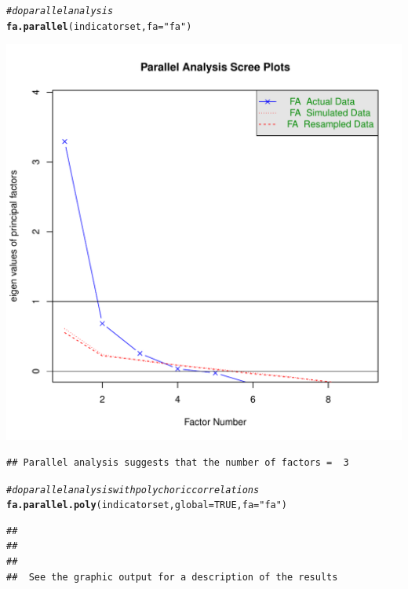 \documentclass{article}\usepackage[]{graphicx}\usepackage[]{color}
\makeatletter
\def\maxwidth{ %
  \ifdim\Gin@nat@width>\linewidth
    \linewidth
  \else
    \Gin@nat@width
  \fi
}
\newcommand{\hlnum}[1]{\textcolor[rgb]{0.686,0.059,0.569}{#1}}%
\newcommand{\hlstr}[1]{\textcolor[rgb]{0.192,0.494,0.8}{#1}}%
\newcommand{\hlcom}[1]{\textcolor[rgb]{0.678,0.584,0.686}{\textit{#1}}}%
\newcommand{\hlstd}[1]{\textcolor[rgb]{0.345,0.345,0.345}{#1}}%
\newcommand{\hlkwc}[1]{\textcolor[rgb]{0.333,0.667,0.333}{#1}}%
\newcommand{\hlkwd}[1]{\textcolor[rgb]{0.737,0.353,0.396}{\textbf{#1}}}%
\newenvironment{kframe}{%
 \def\at@end@of@kframe{}%
 \ifinner\ifhmode%
  \def\at@end@of@kframe{\end{minipage}}%
  \begin{minipage}{\columnwidth}%
 \fi\fi%
 \def\FrameCommand##1{\hskip\@totalleftmargin \hskip-\fboxsep
 \colorbox{shadecolor}{##1}\hskip-\fboxsep
     \hskip-\linewidth \hskip-\@totalleftmargin \hskip\columnwidth}%
 \MakeFramed {\advance\hsize-\width
   \@totalleftmargin\z@ \linewidth\hsize
   \@setminipage}}%
 {\par\unskip\endMakeFramed%
 \at@end@of@kframe}
\newenvironment{knitrout}{}{} %
\makeatother
\begin{document}
\begin{knitrout}
\begin{kframe}
\begin{alltt}
\hlcom{#do parallel analysis}
\hlkwd{fa.parallel}\hlstd{(indicatorset,}\hlkwc{fa}\hlstd{=}\hlstr{"fa"}\hlstd{)}
\end{alltt}
\end{kframe}
\includegraphics[width=\maxwidth]{figure/psych-1} 
\begin{kframe}\begin{verbatim}
## Parallel analysis suggests that the number of factors =  3
\end{verbatim}
\begin{alltt}
\hlcom{#do parallel analysis with polychoric correlations }
\hlkwd{fa.parallel.poly}\hlstd{(indicatorset,}\hlkwc{global}\hlstd{=}\hlnum{TRUE}\hlstd{,}\hlkwc{fa}\hlstd{=}\hlstr{"fa"}\hlstd{)}
\end{alltt}
\begin{verbatim}
## 
## 
## 
##  See the graphic output for a description of the results
\end{verbatim}
\end{kframe}

\end{knitrout}
\end{document}
